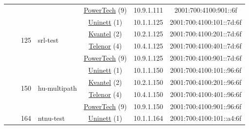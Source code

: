\begin{small}
\begin{center}
\begin{longtable}{|c|c|c|c|c|c|c|c|}
  &  & \multicolumn{2}{|c|}{} & \multicolumn{2}{|c|}{\tiny{\href{http://www.powertech.no}{PowerTech} (9)}} & \tiny{10.9.1.111} & \tiny{2001:700:4100:901::6f} \\* \cline{3-3}\cline{4-4}\cline{5-5}\cline{6-6}\cline{7-7}\cline{8-8}
  &  & \multirow{4}{*}{\tiny{125}} & \multicolumn{1}{|l|}{\multirow{4}{*}{\tiny{srl-test}}} & \multicolumn{2}{|c|}{\tiny{\href{https://www.uninett.no}{Uninett} (1)}} & \tiny{10.1.1.125} & \tiny{2001:700:4100:101::7d:6f} \\* \cline{5-5}\cline{6-6}\cline{7-7}\cline{8-8}
  &  &  &  & \multicolumn{2}{|c|}{\tiny{\href{http://kvantel.no}{Kvantel} (2)}} & \tiny{10.2.1.125} & \tiny{2001:700:4100:201::7d:6f} \\* \cline{5-5}\cline{6-6}\cline{7-7}\cline{8-8}
  &  &  &  & \multicolumn{2}{|c|}{\tiny{\href{https://www.telenor.no}{Telenor} (4)}} & \tiny{10.4.1.125} & \tiny{2001:700:4100:401::7d:6f} \\* \cline{5-5}\cline{6-6}\cline{7-7}\cline{8-8}
  &  &  &  & \multicolumn{2}{|c|}{\tiny{\href{http://www.powertech.no}{PowerTech} (9)}} & \tiny{10.9.1.125} & \tiny{2001:700:4100:901::7d:6f} \\* \cline{3-3}\cline{4-4}\cline{5-5}\cline{6-6}\cline{7-7}\cline{8-8}
  &  & \multirow{4}{*}{\tiny{150}} & \multicolumn{1}{|l|}{\multirow{4}{*}{\tiny{hu-multipath}}} & \multicolumn{2}{|c|}{\tiny{\href{https://www.uninett.no}{Uninett} (1)}} & \tiny{10.1.1.150} & \tiny{2001:700:4100:101::96:6f} \\* \cline{5-5}\cline{6-6}\cline{7-7}\cline{8-8}
  &  &  &  & \multicolumn{2}{|c|}{\tiny{\href{http://kvantel.no}{Kvantel} (2)}} & \tiny{10.2.1.150} & \tiny{2001:700:4100:201::96:6f} \\* \cline{5-5}\cline{6-6}\cline{7-7}\cline{8-8}
  &  &  &  & \multicolumn{2}{|c|}{\tiny{\href{https://www.telenor.no}{Telenor} (4)}} & \tiny{10.4.1.150} & \tiny{2001:700:4100:401::96:6f} \\* \cline{5-5}\cline{6-6}\cline{7-7}\cline{8-8}
  &  &  &  & \multicolumn{2}{|c|}{\tiny{\href{http://www.powertech.no}{PowerTech} (9)}} & \tiny{10.9.1.150} & \tiny{2001:700:4100:901::96:6f} \\* \cline{3-3}\cline{4-4}\cline{5-5}\cline{6-6}\cline{7-7}\cline{8-8}
  &  & \multirow{4}{*}{\tiny{164}} & \multicolumn{1}{|l|}{\multirow{4}{*}{\tiny{ntnu-test}}} & \multicolumn{2}{|c|}{\tiny{\href{https://www.uninett.no}{Uninett} (1)}} & \tiny{10.1.1.164} & \tiny{2001:700:4100:101::a4:6f} \\* \cline{5-5}\cline{6-6}\cline{7-7}\cline{8-8}

\end{longtable}
\end{center}
\end{small}
